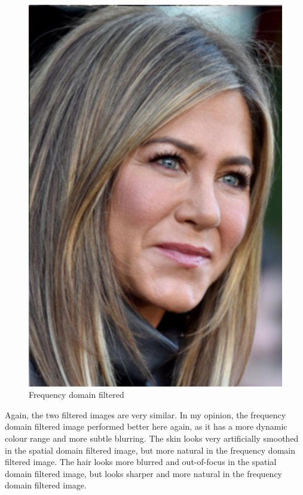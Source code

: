 \documentclass[a4paper]{article}
\begin{document}
\begin{minipage}{0.33\textwidth}
\begin{figure}[H]
    \centering
    \includegraphics[width=\textwidth]{../code/task2/output/jennifer_freq.jpg}
    \caption{Frequency domain filtered}
\end{figure}
\end{minipage}

Again, the two filtered images are very similar.
In my opinion, the frequency domain filtered image performed better here again, as it has a more dynamic colour range and more subtle blurring.
The skin looks very artificially smoothed in the spatial domain filtered image, but more natural in the frequency domain filtered image.
The hair looks more blurred and out-of-focus in the spatial domain filtered image, but looks sharper and more natural in the frequency domain filtered image.
\end{document}
